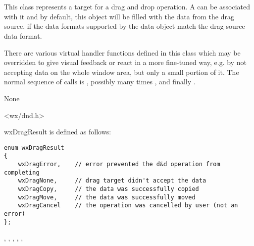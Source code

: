 \section{}\label{wxdroptarget}


This class represents a target for a drag and drop operation. A 
can be associated with it and by default, this object will be filled with the data from the
drag source, if the data formats supported by the data object match the drag source data 
format.

There are various virtual handler functions defined in this class which may be overridden
to give visual feedback or react in a more fine-tuned way, e.g. by not accepting data on
the whole window area, but only a small portion of it. The normal sequence of calls is
, possibly many times ,
 and finally .


None


<wx/dnd.h>


wxDragResult is defined as follows:

{\small\begin{verbatim}
enum wxDragResult
{
    wxDragError,    // error prevented the d&d operation from completing
    wxDragNone,     // drag target didn't accept the data
    wxDragCopy,     // the data was successfully copied
    wxDragMove,     // the data was successfully moved
    wxDragCancel    // the operation was cancelled by user (not an error)
};
\end{verbatim}
}


, , 
, ,
, 


\label{wxdroptargetwxdroptarget}

